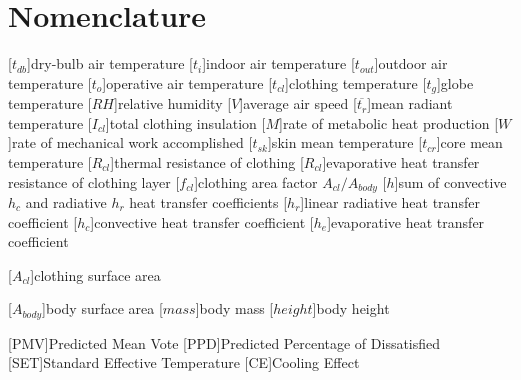 
\section*{Nomenclature}
\renewcommand{\baselinestretch}{0.75}\normalsize
\begin{acronym}[longest]

    [$t_{db}$]{dry-bulb air temperature}
    [$t_{i}$]{indoor air temperature}
    [$t_{out}$]{outdoor air temperature}
    [$t_{o}$]{operative air temperature}
    [$t_{cl}$]{clothing temperature}
    [$t_{g}$]{globe temperature}
    [$RH$]{relative humidity\acroextra{, \%}}
    [$V$]{average air speed}
    [$\overline{t_{r}}$]{mean radiant temperature}
    [$I_{cl}$]{total clothing insulation}
    [$M$]{rate of metabolic heat production}
    [$W$]{rate of mechanical work accomplished}
    [$t_{sk}$]{skin mean temperature}
    [$t_{cr}$]{core mean temperature}
    [$R_{cl}$]{thermal resistance of clothing}
    [$R_{cl}$]{evaporative heat transfer resistance of clothing layer}
    [$f_{cl}$]{clothing area factor $A_{cl}/A_{body}$}
    [$h$]{sum of convective $h_{c}$ and radiative $h_{r}$ heat transfer coefficients}
    [$h_{r}$]{linear radiative heat transfer coefficient}
    [$h_{c}$]{convective heat transfer coefficient}
    [$h_{e}$]{evaporative heat transfer coefficient}

    [$A_{cl}$]{clothing surface area}

    [$A_{body}$]{body surface area}
    [$mass$]{body mass}
    [$height$]{body height}

    [PMV]{Predicted Mean Vote}
    [PPD]{Predicted Percentage of Dissatisfied\acroextra{, \%}}
    [SET]{Standard Effective Temperature}
    [CE]{Cooling Effect}


\end{acronym}
